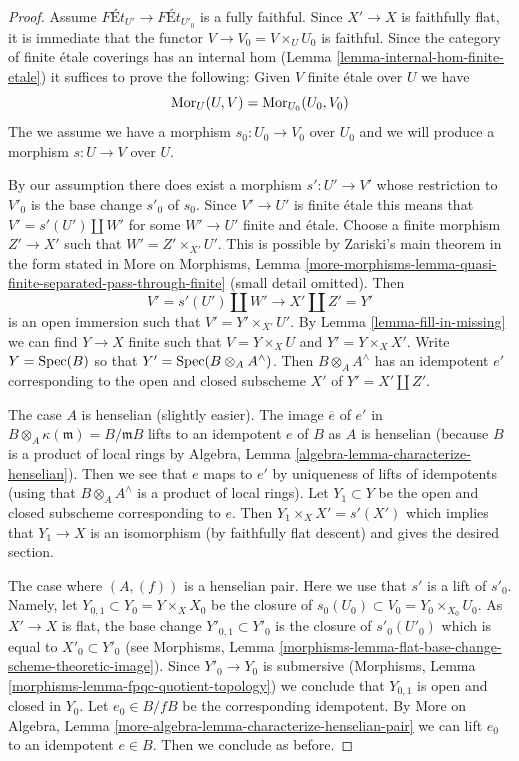 \begin{proof}
Assume $\textit{F\'Et}_{U'} \longrightarrow \textit{F\'Et}_{U'_0}$
is a fully faithful. Since $X' \to X$ is faithfully flat, it is
immediate that the functor $V \to V_0 = V \times_U U_0$ is faithful.
Since the category of finite \'etale coverings has an internal hom
(Lemma \ref{lemma-internal-hom-finite-etale})
it suffices to prove the following: Given $V$ finite \'etale over $U$
we have
$$
\mathop{\mathrm{Mor}}\nolimits_U(U, V) = \mathop{\mathrm{Mor}}\nolimits_{U_0}(U_0, V_0)
$$
The we assume we have a morphism $s_0 : U_0 \to V_0$ over $U_0$ and we will
produce a morphism $s : U \to V$ over $U$.

\medskip\noindent
By our assumption there does exist a morphism $s' : U' \to V'$
whose restriction to $V'_0$ is the base change $s'_0$ of $s_0$.
Since $V' \to U'$ is finite \'etale this means that $V' = s'(U') \amalg W'$
for some $W' \to U'$ finite and \'etale.
Choose a finite morphism $Z' \to X'$ such that $W' = Z' \times_{X'} U'$.
This is possible by Zariski's main theorem in the form stated in
More on Morphisms, Lemma
\ref{more-morphisms-lemma-quasi-finite-separated-pass-through-finite}
(small detail omitted).
Then
$$
V' = s'(U') \amalg W' \longrightarrow X' \amalg Z' = Y'
$$
is an open immersion such that $V' = Y' \times_{X'} U'$.
By Lemma \ref{lemma-fill-in-missing} we can find $Y \to X$ finite
such that $V = Y \times_X U$ and $Y' = Y \times_X X'$.
Write $Y = \mathop{\mathrm{Spec}}(B)$ so that $Y' = \mathop{\mathrm{Spec}}(B \otimes_A A^\wedge)$.
Then $B \otimes_A A^\wedge$ has an idempotent $e'$
corresponding to the open and closed subscheme $X'$ of $Y' = X' \amalg Z'$.

\medskip\noindent
The case $A$ is henselian (slightly easier). The image $\overline{e}$
of $e'$ in $B \otimes_A \kappa(\mathfrak m) = B/\mathfrak mB$ lifts to an
idempotent $e$ of $B$ as $A$ is henselian (because $B$ is a product of
local rings by Algebra, Lemma \ref{algebra-lemma-characterize-henselian}).
Then we see that $e$ maps to $e'$ by uniqueness of lifts of idempotents
(using that $B \otimes_A A^\wedge$ is a product of local rings).
Let $Y_1 \subset Y$ be the open and closed subscheme corresponding to $e$.
Then $Y_1 \times_X X' = s'(X')$ which implies that $Y_1 \to X$ is
an isomorphism (by faithfully flat descent) and gives the desired section.

\medskip\noindent
The case where $(A, (f))$ is a henselian pair. Here we use that $s'$ is
a lift of $s'_0$. Namely, let $Y_{0, 1} \subset Y_0 = Y \times_X X_0$
be the closure of $s_0(U_0) \subset V_0 = Y_0 \times_{X_0} U_0$.
As $X' \to X$ is flat, the base change $Y'_{0, 1} \subset Y'_0$
is the closure of $s'_0(U'_0)$ which is equal to $X'_0 \subset Y'_0$
(see Morphisms, Lemma
\ref{morphisms-lemma-flat-base-change-scheme-theoretic-image}).
Since $Y'_0 \to Y_0$ is submersive
(Morphisms, Lemma \ref{morphisms-lemma-fpqc-quotient-topology})
we conclude that $Y_{0, 1}$ is open and closed in $Y_0$.
Let $e_0 \in B/fB$ be the corresponding idempotent.
By More on Algebra, Lemma
\ref{more-algebra-lemma-characterize-henselian-pair}
we can lift $e_0$ to an idempotent $e \in B$.
Then we conclude as before.
\end{proof}

